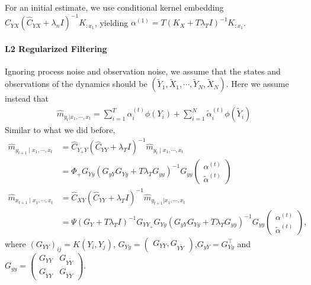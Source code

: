 \documentclass[a4paper]{article}
\newcommand{\T}{\intercal}
\begin{document}
For an initial estimate, we use conditional kernel embedding $\widehat{C}_{YX}(\widehat{C}_{YX} + \lambda_n I)^{-1} K_{:x_1}$, yielding $\alpha^{(1)} = T(K_X + T\lambda_T I)^{-1}K_{:x_1}$.

\paragraph{L2 Regularized Filtering}
Ignoring process noise and observation noise, we assume that the states and observations of the dynamics should be $(\tilde{Y}_1,\tilde{X}_1,\cdots,\tilde{Y}_N,\tilde{X}_N)$. Here we assume instead that 
\begin{align}
\hat{m}_{y_t|x_1,\cdots,x_t} = \sum_{i=1}^T \alpha_i^{(t)} \phi(Y_i) + \sum_{i=1}^N \tilde{\alpha}_i^{(t)} \phi(\tilde{Y}_i)
\end{align}
Similar to what we did before,
\begin{align}
\hat{m}_{y_{t+1}\mid x_1,\cdots,x_t} &= \hat{C}_{Y_{+}Y}(\hat{C}_{YY}+\lambda_T I)^{-1}\hat{m}_{y_t\mid x_1,\cdots,x_t} \\
&= \Phi_{+}G_{Yy}(G_{yY}G_{Yy} + T\lambda_T G_{yy})^{-1}G_{yy} \begin{pmatrix}
\alpha^{(t)}\\
\tilde{\alpha}^{(t)}
\end{pmatrix}\\
\hat{m}_{x_{t+1}\mid x_1,\cdots,x_t} &= \hat{C}_{XY}(\hat{C}_{YY} + \lambda_{T}I)^{-1}\hat{m}_{y_{t+1}|x_1,\cdots,x_t} \\
&= \Psi(G_{Y} + T\lambda_T I)^{-1} G_{YY_+}G_{Yy}(G_{yY}G_{Yy} + T\lambda_T G_{yy})^{-1}G_{yy} \begin{pmatrix}
\alpha^{(t)}\\
\tilde{\alpha}^{(t)}
\end{pmatrix},
\end{align}
where $(G_{YY})_{ij} = K(Y_i,Y_j)$,
$
G_{Yy} = \begin{pmatrix}
G_{YY}, G_{Y\tilde{Y}}
\end{pmatrix}
$,$G_{yY} = G_{Yy}^\T$ and $G_{yy} = \begin{pmatrix}
G_{YY} & G_{Y\tilde{Y}}\\
G_{\tilde{Y}Y} & G_{\tilde{Y}\tilde{Y}}
\end{pmatrix}$.
\end{document}
